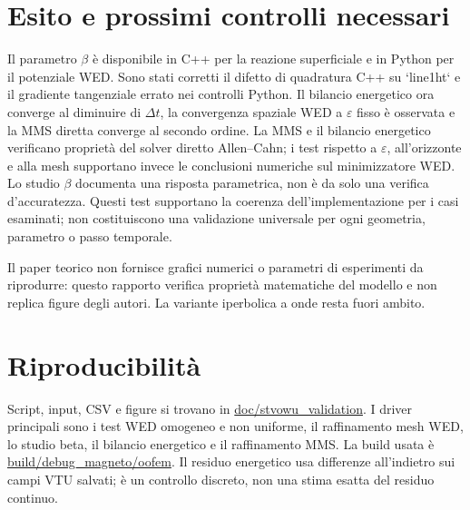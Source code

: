 \documentclass[10pt,a4paper]{article}
\begin{document}
\section{Esito e prossimi controlli necessari}
Il parametro $\beta$ è disponibile in C++ per la reazione superficiale e in Python per il potenziale WED. Sono stati corretti il difetto di quadratura C++ su `line1ht` e il gradiente tangenziale errato nei controlli Python. Il bilancio energetico ora converge al diminuire di $\Delta t$, la convergenza spaziale WED a $\varepsilon$ fisso è osservata e la MMS diretta converge al secondo ordine. La MMS e il bilancio energetico verificano proprietà del solver diretto Allen--Cahn; i test rispetto a $\varepsilon$, all'orizzonte e alla mesh supportano invece le conclusioni numeriche sul minimizzatore WED. Lo studio $\beta$ documenta una risposta parametrica, non è da solo una verifica d'accuratezza. Questi test supportano la coerenza dell'implementazione per i casi esaminati; non costituiscono una validazione universale per ogni geometria, parametro o passo temporale.

Il paper teorico non fornisce grafici numerici o parametri di esperimenti da riprodurre: questo rapporto verifica proprietà matematiche del modello e non replica figure degli autori. La variante iperbolica a onde resta fuori ambito.

\section*{Riproducibilità}
Script, input, CSV e figure si trovano in \url{doc/stvowu_validation}. I driver principali sono i test WED omogeneo e non uniforme, il raffinamento mesh WED, lo studio beta, il bilancio energetico e il raffinamento MMS. La build usata è \url{build/debug_magneto/oofem}. Il residuo energetico usa differenze all’indietro sui campi VTU salvati; è un controllo discreto, non una stima esatta del residuo continuo.
\end{document}
